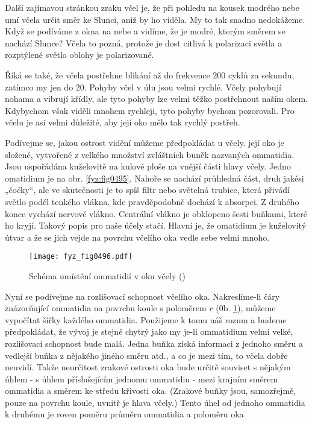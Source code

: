     Další zajímavou stránkou zraku včel je, že při pohledu na kousek modrého nebe umí včela určit
    směr ke Slunci, aniž by ho viděla. My to tak snadno nedokážeme. Když se podíváme z okna na nebe
    a vidíme, že je modré, kterým směrem se nachází Slunce? Včela to pozná, protože je dost citlivá
    k polarizaci světla a rozptýlené světlo oblohy je polarizované.
    
    Říká se také, že včela postřehne blikání až do frekvence 200 cyklů za sekundu, zatímco my jen do
    20. Pohyby včel v úlu jsou velmi rychlé. Včely pohybují nohama a vibrují křídly, ale tyto pohyby
    lze velmi těžko postřehnout naším okem. Kdybychom však viděli mnohem rychleji, tyto pohyby
    bychom pozorovali. Pro včelu je asi velmi důležité, aby její oko mělo tak rychlý postřeh. 
    
    Podívejme se, jakou ostrost vidění můžeme předpokládat u včely. její oko je složené, vytvořené z
    velkého množství zvláštních buněk nazvaných ommatidia. Jsou uspořádána kuželovitě na kulové
    ploše na vnější části hlavy včely. Jedno omatidium je na obr. \ref{fyz:fig0495}.  Nahoře se
    nachází průhledná část, druh jakési „čočky“, ale ve skutečnosti je to spíš filtr nebo světelná
    trubice, která přivádí světlo podél tenkého vlákna, kde pravděpodobně dochází k absorpci. Z
    druhého konce vychází nervové vlákno. Centrální vlákno je obklopeno šesti buňkami, které ho
    kryjí. Takový popis pro naše účely stačí. Hlavní je, že omatidium je kuželovitý útvar a že se
    jich vejde na povrchu včelího oka vedle sebe velmi mnoho.

    \begin{figure}[ht!] %
      \centering
      \texttt{[image: fyz\_fig0496.pdf]}
      \caption{Schéma umístění ommatidií v oku včely (\cite[s.~697]{Feynman01})}
      \label{fyz:fig0496}
    \end{figure}

    Nyní se podívejme na rozlišovací schopnost včelího oka. Nakreslíme-li čáry znázorňující
    ommatidia na povrchu koule s poloměrem \(r\) (0b. \ref{fyz:fig0496}), můžeme vypočítat šířky
    každého ommatidia. Použijeme k tomu náš rozum a budeme předpokládat, že vývoj je stejně chytrý
    jako my je-li ommatidium velmi velké, rozlišovací schopnost bude malá. Jedna buňka získá
    informaci z jednoho směru a vedlejší buňka z nějakého jiného směru atd., a co je mezi tím, to
    včela dobře neuvidí. Takže neurčitost zrakové ostrosti oka bude určitě souviset s nějakým úhlem
    - s úhlem příslušejícím jednomu ommatidiu - mezi krajním směrem ommatidia a směrem ke středu
    křivosti oka. (Zrakové buňky jsou, samozřejmě, pouze na povrchu koule, uvnitř je hlava včely.)
    Tento úhel od jednoho ommatidia k druhému je roven poměru průměru ommatidia a poloměru oka

